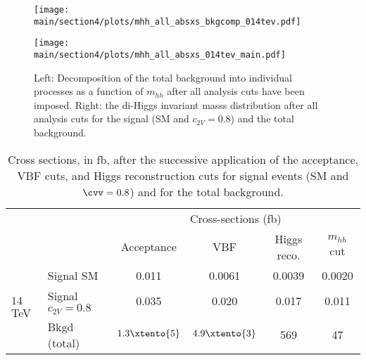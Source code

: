 \begin{figure}[h!]
	\centering
	\begin{minipage}{0.49\textwidth}\centering
		\texttt{[image: \\main/section4/plots/mhh\_all\_absxs\_bkgcomp\_014tev.pdf]}
	\end{minipage}
		\begin{minipage}{0.49\textwidth}\centering
		\texttt{[image: \\main/section4/plots/mhh\_all\_absxs\_014tev\_main.pdf]}
	\end{minipage}
	\caption{\small Left: Decomposition of the total
          background into individual processes as a function of $m_{hh}$
          after all analysis cuts have been imposed.
	  Right: the di-Higgs invariant masss distribution after all analysis cuts
	  for the signal (SM and $c_{2V}=0.8$) and the total background.
	}
	\label{fig:mhhdist} 
\end{figure}

\begin{table}[h]\centering
	\small
	\renewcommand{\arraystretch}{1.5}
	\begin{tabular}{llcccc}
	  \toprule[0.1em]
          & & \multicolumn{4}{c}{Cross-sections (fb) } \\
	&  &  Acceptance & VBF  & Higgs reco. & $m_{hh}$ cut  \\\midrule 
		\multirow{3}{*}{	{\large $14\,$TeV}} 
		& Signal SM &  0.011 & 0.0061 & 0.0039 & 0.0020 \\
		& Signal $c_{2V}=0.8$ & 0.035 & 0.020 & 0.017 & 0.011 \\
		 & Bkgd (total)   & $1.3\xtento{5}$ & $4.9\xtento{3}$ & 569 & 47   \\
                \bottomrule[0.1em]
         \end{tabular} 
        \caption{\small Cross sections, in fb, after the
successive application of the acceptance, VBF cuts, and Higgs reconstruction cuts
for signal events (SM and  $\cvv=0.8$) and for
the total background. \label{tab:xsecs}
}
\end{table}

